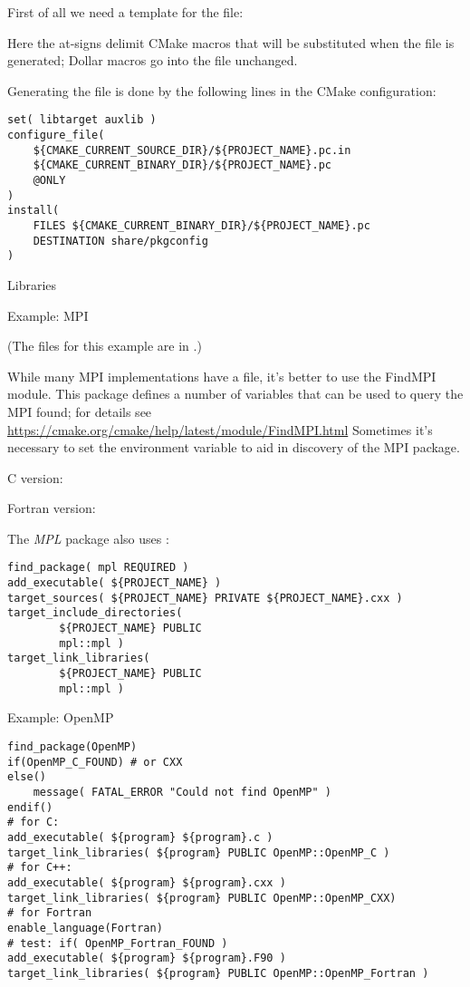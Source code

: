 First of all we need a template for the  file:
%

%
Here the at-signs delimit CMake macros that will be substituted
when the  file is generated;
Dollar macros go into the file unchanged.

Generating the file is done by the following lines in the CMake configuration:
%
\begin{lstlisting}
set( libtarget auxlib )
configure_file(
    ${CMAKE_CURRENT_SOURCE_DIR}/${PROJECT_NAME}.pc.in
    ${CMAKE_CURRENT_BINARY_DIR}/${PROJECT_NAME}.pc
    @ONLY
)  
install(
    FILES ${CMAKE_CURRENT_BINARY_DIR}/${PROJECT_NAME}.pc
    DESTINATION share/pkgconfig
)
\end{lstlisting}

 {Libraries}

 {Example: MPI}

(The files for this example are in .)

While many MPI implementations have a  file,
it's better to use the FindMPI module.
This package defines a number of variables
that can be used to query the MPI found;
for details see \url{https://cmake.org/cmake/help/latest/module/FindMPI.html}
Sometimes it's necessary to set the 
environment variable to aid in discovery of the MPI package.

C version:
%


Fortran version:
%


The \emph{MPL} package also uses :
\begin{lstlisting}
find_package( mpl REQUIRED )
add_executable( ${PROJECT_NAME} )
target_sources( ${PROJECT_NAME} PRIVATE ${PROJECT_NAME}.cxx )
target_include_directories(
        ${PROJECT_NAME} PUBLIC
        mpl::mpl )
target_link_libraries(
        ${PROJECT_NAME} PUBLIC
        mpl::mpl )
\end{lstlisting}


 {Example: OpenMP}
\label{sec:cmake-omp}

\begin{lstlisting}
find_package(OpenMP)
if(OpenMP_C_FOUND) # or CXX
else()
	message( FATAL_ERROR "Could not find OpenMP" )
endif()
# for C:
add_executable( ${program} ${program}.c )
target_link_libraries( ${program} PUBLIC OpenMP::OpenMP_C )
# for C++:
add_executable( ${program} ${program}.cxx )
target_link_libraries( ${program} PUBLIC OpenMP::OpenMP_CXX)
# for Fortran
enable_language(Fortran)
# test: if( OpenMP_Fortran_FOUND )
add_executable( ${program} ${program}.F90 )
target_link_libraries( ${program} PUBLIC OpenMP::OpenMP_Fortran )
\end{lstlisting}

